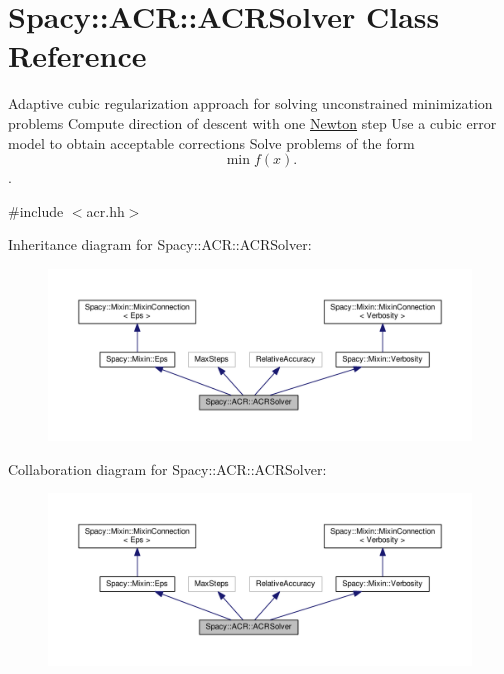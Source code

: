 \hypertarget{classSpacy_1_1ACR_1_1ACRSolver}{\section{Spacy\-:\-:A\-C\-R\-:\-:A\-C\-R\-Solver Class Reference}
\label{classSpacy_1_1ACR_1_1ACRSolver}
}


Adaptive cubic regularization approach for solving unconstrained minimization problems Compute direction of descent with one \hyperlink{namespaceSpacy_1_1Newton}{Newton} step Use a cubic error model to obtain acceptable corrections Solve problems of the form \[\min f(x).\].  




{\ttfamily \#include $<$acr.\-hh$>$}



Inheritance diagram for Spacy\-:\-:A\-C\-R\-:\-:A\-C\-R\-Solver\-:
\nopagebreak
\begin{figure}[H]
\begin{center}
\leavevmode
\includegraphics[width=350pt]{classSpacy_1_1ACR_1_1ACRSolver__inherit__graph}
\end{center}
\end{figure}


Collaboration diagram for Spacy\-:\-:A\-C\-R\-:\-:A\-C\-R\-Solver\-:
\nopagebreak
\begin{figure}[H]
\begin{center}
\leavevmode
\includegraphics[width=350pt]{classSpacy_1_1ACR_1_1ACRSolver__coll__graph}
\end{center}
\end{figure}

